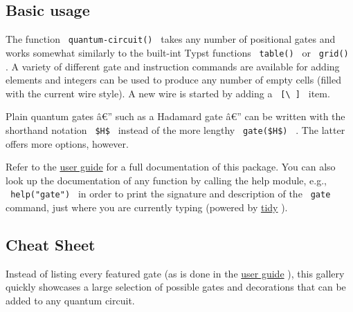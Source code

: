 \subsection{Basic usage}\label{basic-usage}

The function \texttt{\ quantum-circuit()\ } takes any number of
positional gates and works somewhat similarly to the built-int Typst
functions \texttt{\ table()\ } or \texttt{\ grid()\ } . A variety of
different gate and instruction commands are available for adding
elements and integers can be used to produce any number of empty cells
(filled with the current wire style). A new wire is started by adding a
\texttt{\ {[}\textbackslash{}\ {]}\ } item.

\begin{Shaded}
\begin{Highlighting}[]
\NormalTok{\#\{}

\NormalTok{  )}
\NormalTok{\}}
\end{Highlighting}
\end{Shaded}


Plain quantum gates â€'' such as a Hadamard gate â€'' can be written
with the shorthand notation \texttt{\ \$H\$\ } instead of the more
lengthy \texttt{\ gate(\$H\$)\ } . The latter offers more options,
however.

Refer to the
\href{https://github.com/Mc-Zen/quill/releases/download/v0.5.0/quill-guide.pdf}{user
guide} for a full documentation of this package. You can also look up
the documentation of any function by calling the help module, e.g.,
\texttt{\ help("gate")\ } in order to print the signature and
description of the \texttt{\ gate\ } command, just where you are
currently typing (powered by \href{https://github.com/Mc-Zen/tidy}{tidy}
).

\subsection{Cheat Sheet}\label{cheat-sheet}

Instead of listing every featured gate (as is done in the
\href{https://github.com/Mc-Zen/quill/releases/download/v0.5.0/quill-guide.pdf}{user
guide} ), this gallery quickly showcases a large selection of possible
gates and decorations that can be added to any quantum circuit.

